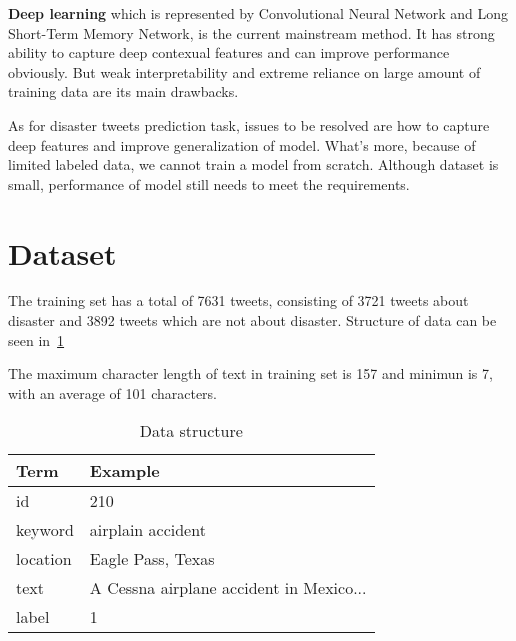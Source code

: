\documentclass{amsart}
\begin{document}
\textbf{Deep learning} which is represented by Convolutional Neural Network and Long Short-Term Memory Network, is the current mainstream method. It has strong ability to capture deep contexual features and can improve performance obviously. But weak interpretability and extreme reliance on large amount of training data are its main drawbacks.

As for disaster tweets prediction task, issues to be resolved are how to capture deep features and improve generalization of model. What's more, because of limited labeled data, we cannot train a model from scratch. Although dataset is small, performance of model still needs to meet the requirements. 




\section{Dataset} \label{sec-dataset}

The training set has a total of 7631 tweets, consisting of 3721 tweets about disaster and 3892 tweets which are not about disaster. Structure of data can be seen in~\cref{tbl:data-structure}




  The maximum character length of text in training set is 157 and minimun is 7, with an average of 101 characters.

  \begin{table}  \centering
    \caption{Data structure}
    \label{tbl:data-structure}
    \begin{tabular}{ll}
  \toprule
      Term    & Example     \\
  \midrule
  id     & 210   \\
  keyword  & airplain accident   \\
  location  & Eagle Pass, Texas   \\
  text   & A Cessna airplane accident in Mexico...            \\
  label  & 1   \\
  \bottomrule
  \end{tabular}
  \end{table}
\end{document}
